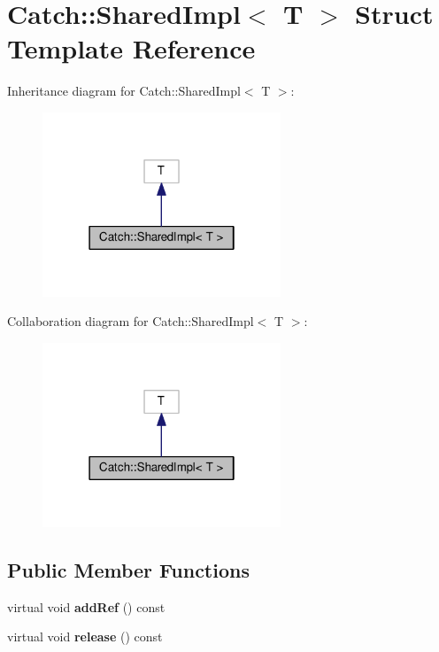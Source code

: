 \hypertarget{structCatch_1_1SharedImpl}{}\section{Catch\+:\+:Shared\+Impl$<$ T $>$ Struct Template Reference}
\label{structCatch_1_1SharedImpl}


Inheritance diagram for Catch\+:\+:Shared\+Impl$<$ T $>$\+:
\nopagebreak
\begin{figure}[H]
\begin{center}
\leavevmode
\includegraphics[width=202pt]{structCatch_1_1SharedImpl__inherit__graph}
\end{center}
\end{figure}


Collaboration diagram for Catch\+:\+:Shared\+Impl$<$ T $>$\+:
\nopagebreak
\begin{figure}[H]
\begin{center}
\leavevmode
\includegraphics[width=202pt]{structCatch_1_1SharedImpl__coll__graph}
\end{center}
\end{figure}
\subsection*{Public Member Functions}
\begin{DoxyCompactItemize}
\item 
virtual void {\bfseries add\+Ref} () const \hypertarget{structCatch_1_1SharedImpl_a9b190b7a139a09d2624d1201d8e4f87e}{}\label{structCatch_1_1SharedImpl_a9b190b7a139a09d2624d1201d8e4f87e}

\item 
virtual void {\bfseries release} () const \hypertarget{structCatch_1_1SharedImpl_a16baad80ad5ad3dfaf2a10a157a02e01}{}\label{structCatch_1_1SharedImpl_a16baad80ad5ad3dfaf2a10a157a02e01}

\end{DoxyCompactItemize}
